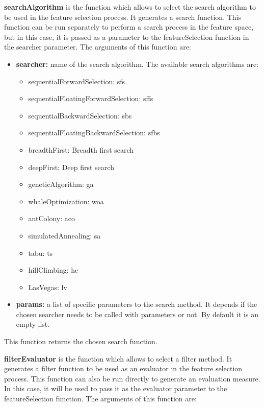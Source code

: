 \textbf{searchAlgorithm} is the function which allows to select the search algorithm to be used in the feature selection process. It generates a search function. This function can be run separately to perform a search process in the feature space, but in this case, it is passed as a parameter to the featureSelection function in the searcher parameter. The arguments of this function are:

\begin{itemize}
    \item \textbf{searcher:} name of the search algorithm. The available search algorithms are:
    
    \begin{itemize}
        \item sequentialForwardSelection: \acrfull{sfs}.
        \item sequentialFloatingForwardSelection: \acrfull{sffs}
        \item sequentialBackwardSelection: \acrfull{sbs}
        \item sequentialFloatingBackwardSelection: \acrfull{sfbs}
        \item breadthFirst: Breadth first search
        \item deepFirst: Deep first search
        \item geneticAlgorithm: \acrfull{ga}
        \item whaleOptimization: \acrfull{woa}
        \item antColony: \acrfull{aco}
        \item simulatedAnnealing: \acrfull{sa}
        \item tabu: \acrfull{ts}
        \item hillClimbing: \acrfull{hc}
        \item LasVegas: \acrfull{lv}
    \end{itemize}
    
    \item \textbf{params:} a list of specific parameters to the search method. It depends if the chosen searcher needs to be called with parameters or not. By default it is an empty list.
\end{itemize}

This function returns the chosen search function.

\textbf{filterEvaluator} is the function which allows to select a filter method. It generates a filter function to be used as an evaluator in the feature selection process. This function can also be run directly to generate an evaluation measure. In this case, it will be used to pass it as the evaluator parameter to the featureSelection function. The arguments of this function are:

